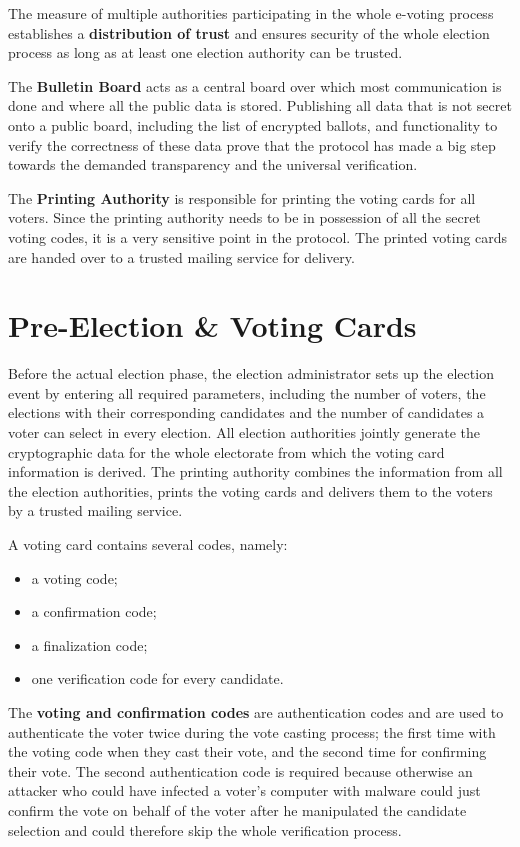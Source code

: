 The measure of multiple authorities participating in the whole e-voting process establishes a \textbf{distribution of trust} and ensures security of the whole election process as long as at least one election authority can be trusted.

The \textbf{Bulletin Board} acts as a central board over which most communication is done and where all the public data is stored. Publishing all data that is not secret onto a public board, including the list of encrypted ballots, and functionality to verify the correctness of these data prove that the protocol has made a big step towards the demanded transparency and the universal verification.

The \textbf{Printing Authority} is responsible for printing the voting cards for all voters. Since the printing authority needs to be in possession of all the secret voting codes, it is a very sensitive point in the protocol. The printed voting cards are handed over to a trusted mailing service for delivery.

\section{Pre-Election \& Voting Cards}
Before the actual election phase, the election administrator sets up the election event by entering all required parameters, including the number of voters, the elections with their corresponding candidates and the number of candidates a voter can select in every election. All election authorities jointly generate the cryptographic data for the whole electorate from which the voting card information is derived. The printing authority combines the information from all the election authorities, prints the voting cards and delivers them to the voters by a trusted mailing service.

A voting card contains several codes, namely:

\begin{itemize}
	\item a voting code;
	\item a confirmation code;
	\item a finalization code;
	\item one verification code for every candidate.
\end{itemize}

The \textbf{voting and confirmation codes} are authentication codes and are used to authenticate the voter twice during the vote casting process; the first time with the voting code when they cast their vote, and the second time for confirming their vote. The second authentication code is required because otherwise an attacker who could have infected a voter's computer with malware could just confirm the vote on behalf of the voter after he manipulated the candidate selection and could therefore skip the whole verification process.

